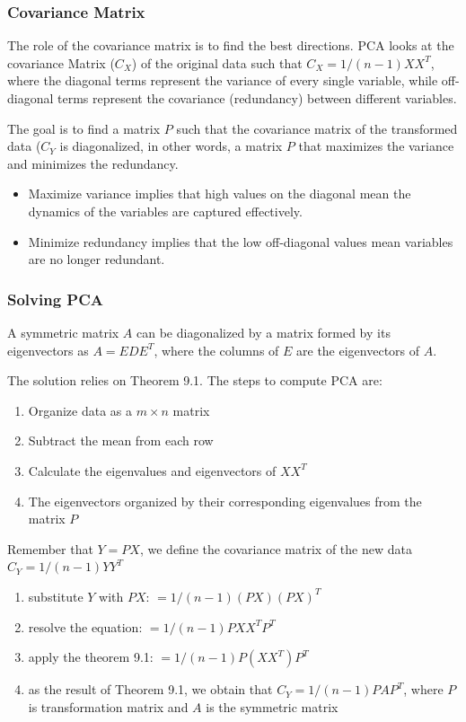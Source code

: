 \subsubsection{Covariance Matrix}
The role of the covariance matrix is to find the best directions. PCA looks at the covariance Matrix (\(C_X\)) of the original data such that \(C_X = 1/(n-1)XX^T\), where the diagonal terms represent the variance of every single variable, while off-diagonal terms represent the covariance (redundancy) between different variables.\par
The goal is to find a matrix \(P\) such that the covariance matrix of the transformed data (\(C_Y\) is diagonalized, in other words, a matrix \(P\) that maximizes the variance and minimizes the redundancy. 
\begin{itemize}[noitemsep]
    \item Maximize variance implies that high values on the diagonal mean the dynamics of the variables are captured effectively.
    \item Minimize redundancy implies that the low off-diagonal values mean variables are no longer redundant.
\end{itemize}

\subsubsection{Solving PCA}
\begin{theorem}
    A symmetric matrix \(A\) can be diagonalized by a matrix formed by its eigenvectors as \(A = EDE^T\), where the columns of \(E\) are the eigenvectors of \(A\).
\end{theorem}

The solution relies on Theorem 9.1. The steps to compute PCA are:
\begin{enumerate}[noitemsep]
    \item Organize data as a \(m \times n\) matrix
    \item Subtract the mean from each row
    \item Calculate the eigenvalues and eigenvectors of \(XX^T\)
    \item The eigenvectors organized by their corresponding eigenvalues from the matrix \(P\)
\end{enumerate}

Remember that \(Y=PX\), we define the covariance matrix of the new data \(C_Y = 1/(n-1)YY^T\)
\begin{enumerate}[noitemsep]
    \item substitute \(Y\) with \(PX\): \(= 1/(n-1)(PX)(PX)^T\)
    \item resolve the equation: \(= 1/(n-1)PXX^TP^T\)
    \item apply the theorem 9.1: \(= 1/(n-1)P(XX^T)P^T\)
    \item as the result of Theorem 9.1, we obtain that \(C_Y = 1/(n-1)PAP^T\), where \(P\) is transformation matrix and \(A\) is the symmetric matrix
\end{enumerate}


